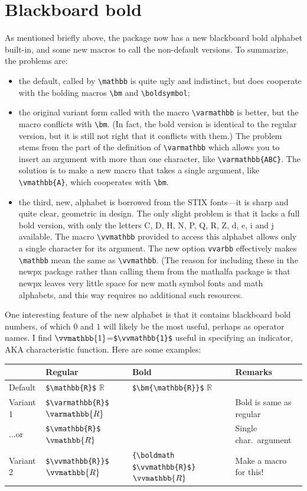 \documentclass[11pt]{article}
\theoremstyle{oldplain}
\theoremstyle{plain}
\begin{document}
\section{Blackboard bold}
As mentioned briefly above, the package now has a new blackboard bold alphabet built-in, and some new macros to call the non-default versions. To summarize, the problems are:
\begin{itemize}
\item
the default, called by \verb|\mathbb| is quite ugly and indistinct, but does cooperate with the bolding macros \verb|\bm| and \verb|\boldsymbol|;
\item the original variant form called with the macro \verb|\varmathbb| is better, but the macro conflicts with \verb|\bm|. (In fact, the bold version is identical to the regular version, but it is still not right that it conflicts with them.) The problem stems from the part of the definition of \verb|\varmathbb| which allows you to insert an argument with more than one character, like \verb|\varmathbb{ABC}|. The solution is to make a new macro that takes a single argument, like \verb|\vmathbb{A}|, which cooperates with \verb|\bm|.
\item the third, new, alphabet is borrowed from the STIX fonts---it is sharp and quite clear, geometric in design. The only slight problem is that it lacks a full bold version, with only the letters C, D, H, N, P, Q, R, Z, d, e, i and j available. The macro \verb|\vvmathbb| provided to access this alphabet allows only a single character for its argument. The new option {\tt vvarbb} effectively makes \verb|\mathbb| mean the same as \verb|\vvmathbb|.
(The reason for including these in the \textsf{newpx} package rather than calling them from the \textsf{mathalfa} package is that \textsf{newpx} leaves very little space for new math symbol fonts and math alphabets, and this way requires no additional such resources.
\end{itemize}
One interesting feature of the new alphabet is that it contains blackboard bold numbers, of which $0$ and $1$ will likely be the most useful, perhaps as operator names. I find $\vvmathbb{1}$=\verb|$\vvmathbb{1}$| useful in specifying an indicator, AKA characteristic function. Here are some examples:

\begin{center}
  \begin{tabular}{@{} llll @{}}
    \toprule
     & Regular & Bold & Remarks \\ 
    \midrule
Default  & \verb|$\mathbb{R}$| $\mathbb{R}$& \verb|$\bm{\mathbb{R}}$| $\bm{\mathbb{R}}$\\ 
Variant 1     & \verb|$\varmathbb{R}$| $\varmathbb{R}$ &  & Bold is same as regular \\ 
$\dots$or     & \verb|$\vmathbb{R}$| $\vmathbb{R}$ &  & Single char.\ argument\\ 
Variant 2 & \verb|$\vvmathbb{R}}$| $\vvmathbb{R}$& \verb|{\boldmath $\vvmathbb{R}$}| {\boldmath $\vvmathbb{R}$} & Make a macro for this! \\ 
    \bottomrule
  \end{tabular}
\end{center}
\end{document}

